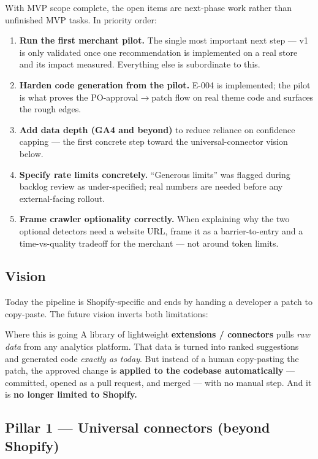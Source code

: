 \documentclass[11pt,a4paper]{article}
\begin{document}
With MVP scope complete, the open items are next-phase work rather than
unfinished MVP tasks. In priority order:

\begin{enumerate}[leftmargin=1.4em]
  \item \textbf{Run the first merchant pilot.} The single most important next
  step --- v1 is only validated once one recommendation is implemented on a
  real store and its impact measured. Everything else is subordinate to this.
  \item \textbf{Harden code generation from the pilot.} E-004 is implemented;
  the pilot is what proves the PO-approval$\rightarrow$patch flow on real theme
  code and surfaces the rough edges.
  \item \textbf{Add data depth (GA4 and beyond)} to reduce reliance on
  confidence capping --- the first concrete step toward the universal-connector
  vision below.
  \item \textbf{Specify rate limits concretely.} ``Generous limits'' was
  flagged during backlog review as under-specified; real numbers are needed
  before any external-facing rollout.
  \item \textbf{Frame crawler optionality correctly.} When explaining why the
  two optional detectors need a website URL, frame it as a barrier-to-entry and
  a time-vs-quality tradeoff for the merchant --- not around token limits.
\end{enumerate}

\subsection{Vision}

Today the pipeline is Shopify-specific and ends by handing a developer a patch
to copy-paste. The future vision inverts both limitations:

\begin{keybox}{Where this is going}
A library of lightweight \textbf{extensions / connectors} pulls \emph{raw data}
from any analytics platform. That data is turned into ranked suggestions and
generated code \emph{exactly as today}. But instead of a human copy-pasting the
patch, the approved change is \textbf{applied to the codebase automatically} ---
committed, opened as a pull request, and merged --- with no manual step. And it
is \textbf{no longer limited to Shopify.}
\end{keybox}

\subsection{Pillar 1 --- Universal connectors (beyond Shopify)}
\end{document}
